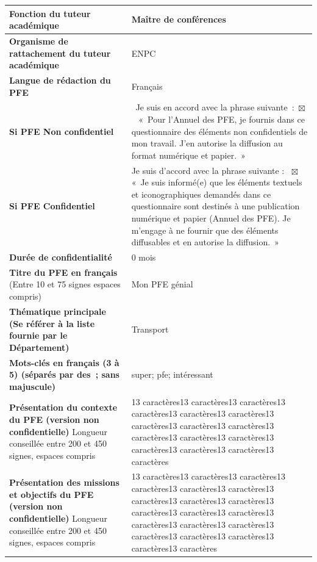 \documentclass[12pt,a4paper]{article}
\newcommand{\CheckedBox}{\ensuremath{\boxtimes}} %
\begin{document}
\begin{longtable}{|p{7cm}|p{9cm}|}
    \textbf{Fonction du tuteur académique} & Maître de conférences \\ \hline
    \textbf{Organisme de rattachement du tuteur académique} & ENPC \\ \hline
    \textbf{Langue de rédaction du PFE} & Français \\ \hline
    \textbf{Si PFE Non confidentiel} & ~Je suis en accord avec la phrase suivante :~$\CheckedBox$~ \newline\newline« Pour l'Annuel des PFE, je fournis dans ce questionnaire des éléments non confidentiels de mon travail. J'en autorise la diffusion au format numérique et papier. »\\ \hline
    \textbf{Si PFE Confidentiel} &  Je suis d'accord avec la phrase suivante : ~$\CheckedBox$~ \newline\newline « Je suis informé(e) que les éléments textuels et iconographiques demandés dans ce questionnaire sont destinés à une publication numérique et papier (Annuel des PFE). Je m'engage à ne fournir que des éléments diffusables et en autorise la diffusion. » \\ \hline
    \textbf{Durée de confidentialité} & 0 mois \\ \hline
    \textbf{Titre du PFE en français} (Entre 10 et 75 signes espaces compris) & Mon PFE génial \\ \hline
    \textbf{Thématique principale \newline\newline 
(Se référer à la liste fournie par le Département)} & Transport \\ \hline
    \textbf{Mots-clés en français (3 à 5) (séparés par des ; sans majuscule)} & super; pfe; intéressant \\ \hline
    \textbf{Présentation du contexte du PFE (version non confidentielle)} Longueur conseillée entre 200 et 450 signes, espaces compris
 & 13 caractères13 caractères13 caractères13 caractères13 caractères13 caractères13 caractères13 caractères13 caractères13 caractères13 caractères13 caractères13 caractères13 caractères13 caractères13 caractères \\ \hline
    \textbf{Présentation des missions et objectifs du PFE (version non confidentielle)} Longueur conseillée entre 200 et 450 signes, espaces compris & 13 caractères13 caractères13 caractères13 caractères13 caractères13 caractères13 caractères13 caractères13 caractères13 caractères13 caractères13 caractères13 caractères13 caractères13 caractères13 caractères13 caractères13 caractères13 caractères13 caractères \\ \hline

\end{longtable}
\end{document}
